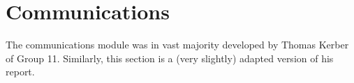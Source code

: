 \section{Communications}
The communications module was in vast majority developed by Thomas Kerber of Group 11. Similarly, this section is a (very slightly) adapted version of his report.



